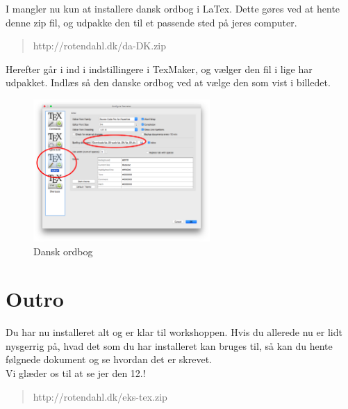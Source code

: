 \documentclass{article}                                                        %
\begin{document}
	I mangler nu kun at installere dansk ordbog i LaTex.
	Dette gøres ved at hente denne zip fil, og udpakke den til et passende sted
	på jeres computer.
	\begin{quote}
			http://rotendahl.dk/da-DK.zip
	\end{quote}

	Herefter går i ind i indstillingere i TexMaker, og vælger den fil i
	lige har udpakket.
	Indlæs så den danske ordbog ved at vælge den som vist i billedet.
	\begin{figure}[h!]
    	\caption{Dansk ordbog}
        \centering
        \includegraphics[width=0.6\textwidth]{./include/danish.png}
    \end{figure}

	\section{Outro}
	Du har nu installeret alt og er klar til workshoppen.
	Hvis du allerede nu er lidt nysgerrig på, hvad det som du har installeret
	kan bruges til, så kan du hente følgnede dokument og se hvordan det er
	skrevet.
    \\ Vi glæder os til at se jer den 12.!
	\begin{quote}
		http://rotendahl.dk/eks-tex.zip
	\end{quote}
\end{document}
